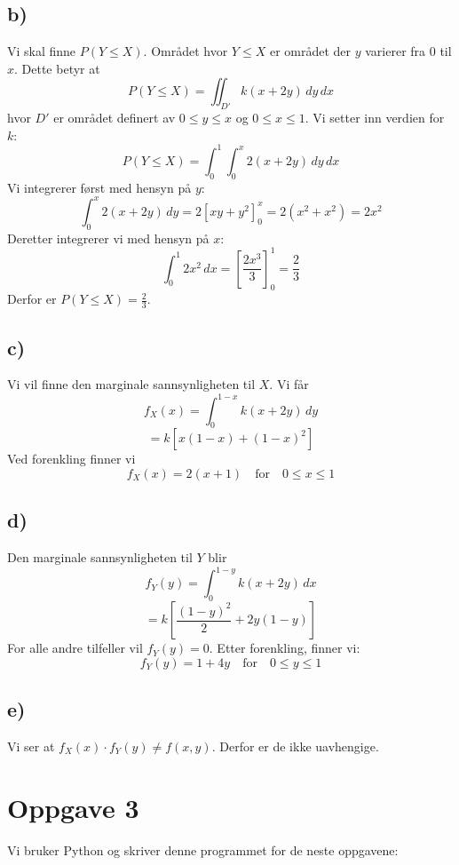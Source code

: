 \documentclass[a4paper, 12pt]{article}
\begin{document}
\subsection*{b)}
Vi skal finne \( P(Y \leq X) \). Området hvor \( Y \leq X \) er området der \( y \) varierer fra 0 til \( x \). Dette betyr at
\[
P(Y \leq X) = \iint_{D'} k(x + 2y) \, dy \, dx
\]
hvor \( D' \) er området definert av \( 0 \leq y \leq x \) og \( 0 \leq x \leq 1 \). Vi setter inn verdien for \( k \):
\[
P(Y \leq X) = \int_0^1 \int_0^x 2(x + 2y) \, dy \, dx
\]
Vi integrerer først med hensyn på \( y \):
\[
\int_0^x 2(x + 2y) \, dy = 2\left[xy + y^2\right]_{0}^{x} = 2(x^2 + x^2) = 2x^2
\]
Deretter integrerer vi med hensyn på \( x \):
\[
\int_0^1 2x^2 \, dx = \left[\frac{2x^3}{3}\right]_{0}^{1} = \frac{2}{3}
\]
Derfor er \( P(Y \leq X) = \frac{2}{3} \).

\subsection*{c)}
Vi vil finne den marginale sannsynligheten til \( X \). Vi får
\[
f_X(x) = \int_0^{1-x} k(x + 2y) \, dy
\]
\[
= k\left[x(1-x) + (1-x)^2\right]
\]
Ved forenkling finner vi
\[
f_X(x) = 2(x + 1) \quad \text{for} \quad 0 \leq x \leq 1
\]

\subsection*{d)}
Den marginale sannsynligheten til \( Y \) blir
\[
f_Y(y) = \int_0^{1-y} k(x + 2y) \, dx
\]
\[
= k\left[\frac{(1-y)^2}{2} + 2y(1-y)\right]
\]
For alle andre tilfeller vil \( f_Y(y) = 0 \). Etter forenkling, finner vi:
\[
f_Y(y) = 1 + 4y \quad \text{for} \quad 0 \leq y \leq 1
\]

\subsection*{e)}
Vi ser at \( f_X(x) \cdot f_Y(y) \neq f(x, y) \). Derfor er de ikke uavhengige.

\section*{Oppgave 3}
Vi bruker Python og skriver denne programmet for de neste oppgavene:
\end{document}
